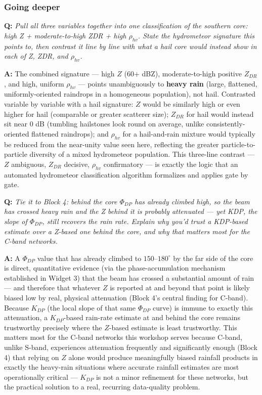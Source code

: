 \documentclass[11pt]{article}
\newenvironment{qa}[1]{\par\noindent\textbf{\color{qgray}Q: }\emph{#1}\par\noindent\textbf{A: }}{\par\vspace{6pt}}
\newcommand{\tier}[1]{\subsubsection*{#1}}
\begin{document}
\tier{Going deeper}
\begin{qa}{Pull all three variables together into one classification of the southern core: high Z + moderate-to-high ZDR + high $\rho_{hv}$. State the hydrometeor signature this points to, then contrast it line by line with what a hail core would instead show in each of Z, ZDR, and $\rho_{hv}$.}
The combined signature --- high $Z$ (60+ dBZ), moderate-to-high positive $Z_{DR}$, and high, uniform $\rho_{hv}$ --- points unambiguously to \textbf{heavy rain} (large, flattened, uniformly-oriented raindrops in a homogeneous population), not hail. Contrasted variable by variable with a hail signature: $Z$ would be similarly high or even higher for hail (comparable or greater scatterer size); $Z_{DR}$ for hail would instead sit near 0 dB (tumbling hailstones look round on average, unlike consistently-oriented flattened raindrops); and $\rho_{hv}$ for a hail-and-rain mixture would typically be reduced from the near-unity value seen here, reflecting the greater particle-to-particle diversity of a mixed hydrometeor population. This three-line contrast --- $Z$ ambiguous, $Z_{DR}$ decisive, $\rho_{hv}$ confirmatory --- is exactly the logic that an automated hydrometeor classification algorithm formalizes and applies gate by gate.
\end{qa}
\begin{qa}{Tie it to Block 4: behind the core $\Phi_{DP}$ has already climbed high, so the beam has crossed heavy rain and the Z behind it is probably attenuated --- yet KDP, the slope of $\Phi_{DP}$, still recovers the rain rate. Explain why you'd trust a KDP-based estimate over a Z-based one behind the core, and why that matters most for the C-band networks.}
A $\Phi_{DP}$ value that has already climbed to $150$--$180^\circ$ by the far side of the core is direct, quantitative evidence (via the phase-accumulation mechanism established in Widget 3) that the beam has crossed a substantial amount of rain --- and therefore that whatever $Z$ is reported at and beyond that point is likely biased low by real, physical attenuation (Block 4's central finding for C-band). Because $K_{DP}$ (the local slope of that same $\Phi_{DP}$ curve) is immune to exactly this attenuation, a $K_{DP}$-based rain-rate estimate at and behind the core remains trustworthy precisely where the $Z$-based estimate is least trustworthy. This matters most for the C-band networks this workshop serves because C-band, unlike S-band, experiences attenuation frequently and significantly enough (Block 4) that relying on $Z$ alone would produce meaningfully biased rainfall products in exactly the heavy-rain situations where accurate rainfall estimates are most operationally critical --- $K_{DP}$ is not a minor refinement for these networks, but the practical solution to a real, recurring data-quality problem.
\end{qa}
\end{document}
